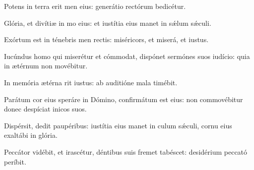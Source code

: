 \item {}

\item Potens in terra erit men eius:\psstar{} generátio rectórum bedicétur.

\item Glória, et divítiæ in mo eius:\psstar{} et iustítia eius manet in sǽlum sǽculi.

\item Exórtum est in ténebris men rectis:\psstar{} miséricors, et miserá, et iustus.

\item Iucúndus homo qui miserétur et cómmodat,\pscross{} dispónet sermónes suos  iudício:\psstar{} quia in ætérnum non movébitur.

\item In memória ætérna rit iustus:\psstar{} ab auditióne mala  timébit.

\item Parátum cor eius speráre in Dómino,\pscross{} confirmátum est  eius:\psstar{} non commovébitur donec despíciat inicos suos.

\item Dispérsit, dedit paupéribus:\pscross{} iustítia eius manet in culum sǽculi,\psstar{} cornu eius exaltábi in glória.

\item Peccátor vidébit, et irascétur,\pscross{} déntibus suis fremet  tabéscet:\psstar{} desidérium peccató períbit.